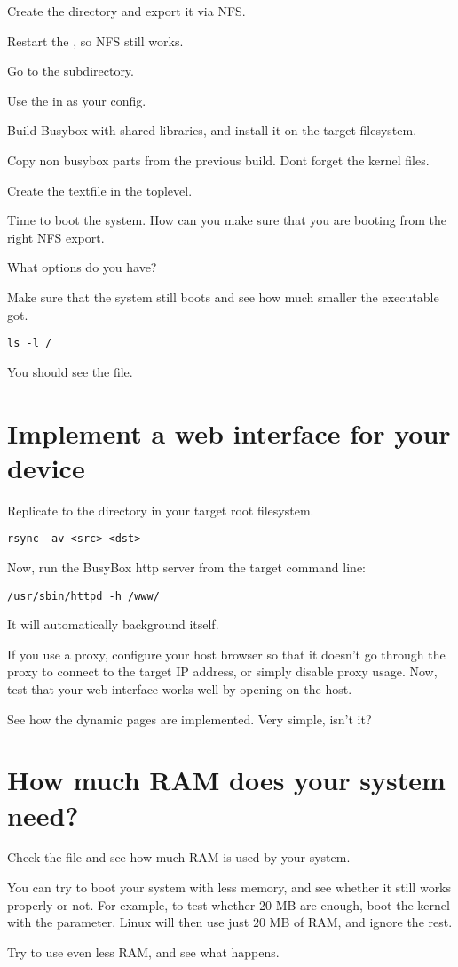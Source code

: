 Create the  directory and export it via NFS.

Restart the , so NFS still works.

Go to the  subdirectory.

Use the  in  as your config.

Build Busybox with shared libraries, and install it on the target filesystem. 

Copy non busybox parts from the previous build. Dont forget the kernel files.

Create the  textfile in the toplevel.

Time to boot the system. How can you make sure that 
you are booting from the right NFS export.

What options do you have?

Make sure that the system still boots and see
how much smaller the  executable got.


\begin{verbatim}
ls -l /
\end{verbatim}

You should see the  file.

\section{Implement a web interface for your device}

Replicate  to the  directory in your target root filesystem.

\begin{verbatim}
rsync -av <src> <dst>
\end{verbatim}

Now, run the BusyBox http server from the target command line:

\begin{verbatim}
/usr/sbin/httpd -h /www/
\end{verbatim}

It will automatically background itself.

If you use a proxy, configure your host browser so that it doesn't go
through the proxy to connect to the target IP address, or simply
disable proxy usage.  Now, test that your web interface works well by
opening  on the host.

See how the dynamic pages are implemented. Very simple, isn't it?

\section{How much RAM does your system need?}

Check the  file and see how much RAM is used by your
system.

You can try to boot your system with less memory, and see whether it
still works properly or not. For example, to test whether 20 MB are
enough, boot the kernel with the  parameter. Linux will then
use just 20 MB of RAM, and ignore the rest.

Try to use even less RAM, and see what happens.
